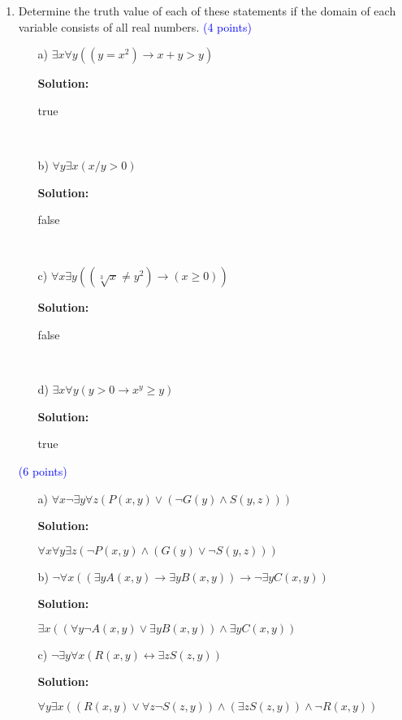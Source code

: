 \documentclass{article}
\newcommand{\pt}[1]{\textcolor{blue}{(#1 points)}}
\newenvironment{solution}
{
\par
\color{blue}
\textbf{Solution:}
}
{
\par
}
\begin{document}
\begin{enumerate}
\begin{enumerate}
    \end{enumerate}
    
    \item Determine the truth value of each of these statements if the domain of each variable consists of all real numbers. \pt{4}
    \begin{enumerate}
        \item[a)] $\exists x \forall y((y = x^2) \rightarrow x + y > y)$\
        \begin{solution}
        true
        \end{solution}\\
        \item[b)] $\forall y \exists x (x/y > 0)$\
        \begin{solution}
        false
        \end{solution}\\
        
        \item[c)] $\forall x \exists y((\sqrt[3]{x} \neq y^2) \rightarrow (x \geq 0))$\
        
        \begin{solution}
        false
        \end{solution}\\
        
        \item[d)] $\exists x \forall y(y > 0 \rightarrow x^y \geq y)$\
        
        \begin{solution}
        true
        \end{solution}
    \end{enumerate}
    
    
    
    \pt{6}\\
    \begin{enumerate}
        \item[a)] $\forall x \neg \exists y \forall z (P(x, y) \lor (\lnot G(y) \land S(y, z)))$
        \begin{solution}
        $\forall x \forall y \exists z (\neg P(x, y) \land (G(y) \lor \neg S(y, z)))$
        \end{solution}
        \item[b)] $\neg \forall x (( \exists y A(x, y) \rightarrow \exists y B(x, y)) \rightarrow \neg \exists y C(x, y)) $
        \begin{solution}
        $\exists x (( \forall y \neg A(x, y) \lor \exists y B(x, y)) \land \exists y C(x, y))$
        \end{solution}
        \item[c)] $\neg  \exists y \forall x (R(x,y) \leftrightarrow \exists z S(z,y))$
        \begin{solution}
        $\forall y \exists x ((R(x, y) \lor \forall z \neg S(z, y)) \land (\exists z S(z, y)) \land \neg R(x,y))$
        \end{solution}
        

\end{enumerate}
\end{enumerate}
\end{document}
